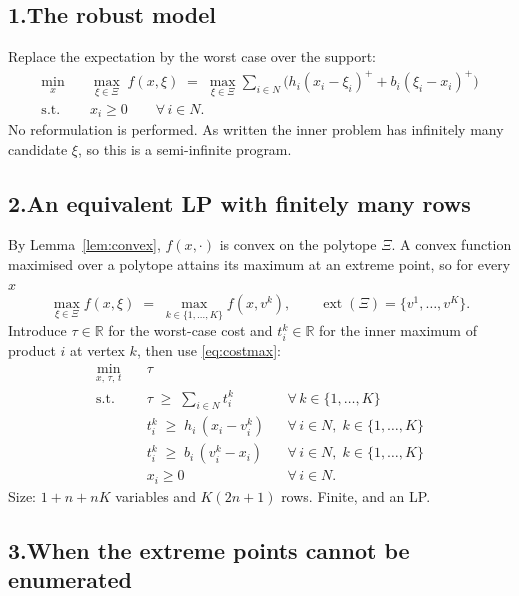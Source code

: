 \documentclass[11pt]{article}
\DeclareMathOperator*{\minimize}{min}
\DeclareMathOperator*{\maximize}{max}
\DeclareMathOperator{\ext}{ext}
\theoremstyle{definition}
\begin{document}
\subsection*{1.\quad The robust model}

Replace the expectation by the worst case over the support:
\begin{align}
  \minimize_{x} \quad & \maximize_{\xi \in \Xi}\; f(x,\xi)
    \;=\; \maximize_{\xi \in \Xi} \sum_{i\in N}
      \Big( h_i(x_i-\xi_i)^{+} + b_i(\xi_i-x_i)^{+} \Big) \\
  \text{s.t.}\quad & x_i \ge 0 \qquad \forall\, i \in N .
\end{align}
No reformulation is performed. As written the inner problem has infinitely
many candidate $\xi$, so this is a semi-infinite program.

\subsection*{2.\quad An equivalent LP with finitely many rows}

By Lemma~\ref{lem:convex}, $f(x,\cdot)$ is convex on the polytope $\Xi$. A
convex function maximised over a polytope attains its maximum at an
extreme point, so for every $x$
\begin{equation}
  \maximize_{\xi \in \Xi} f(x,\xi)
  \;=\; \max_{k \in \{1,\dots,K\}} f(x, v^{k}),
  \qquad \ext(\Xi) = \{v^1,\dots,v^K\}.
  \label{eq:vertexmax}
\end{equation}
Introduce $\tau \in \mathbb{R}$ for the worst-case cost and
$t^{k}_i \in \mathbb{R}$ for the inner maximum of product $i$ at vertex
$k$, then use \eqref{eq:costmax}:
\begin{align}
  \minimize_{x,\,\tau,\,t} \quad & \tau \\
  \text{s.t.}\quad
    & \tau \;\ge\; \sum_{i \in N} t^{k}_i
      && \forall\, k \in \{1,\dots,K\}
      \label{eq:p2epi}\\
    & t^{k}_i \;\ge\; h_i\,(x_i - v^{k}_i)
      && \forall\, i \in N,\; k \in \{1,\dots,K\} \\
    & t^{k}_i \;\ge\; b_i\,(v^{k}_i - x_i)
      && \forall\, i \in N,\; k \in \{1,\dots,K\} \\
    & x_i \ge 0 && \forall\, i \in N .
\end{align}
Size: $1 + n + nK$ variables and $K(2n+1)$ rows. Finite, and an LP.

\subsection*{3.\quad When the extreme points cannot be enumerated}
\end{document}

